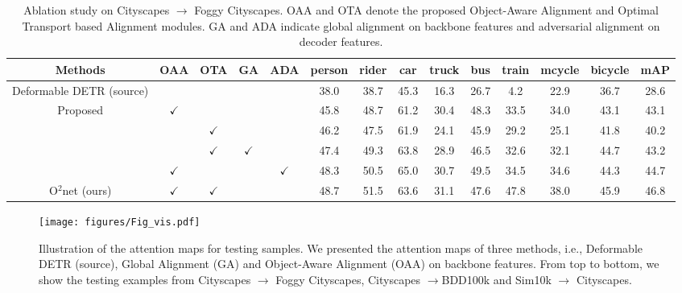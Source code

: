 \documentclass[sigconf]{acmart}
\begin{document}
\begin{table*}[t]
    \centering
    \small
    \caption{Ablation study on Cityscapes $\rightarrow$ Foggy Cityscapes. OAA and OTA denote the proposed Object-Aware Alignment and Optimal Transport based Alignment modules. GA and ADA indicate global alignment on backbone features and adversarial alignment on decoder features.} \label{tab:ablation}
    \setlength{\tabcolsep}{2mm}
    \begin{tabular}{c|cccc|cccccccc|c}
        \toprule[1.0pt]
        Methods & OAA & OTA & GA & ADA  & person & rider & car & truck & bus & train & mcycle & bicycle & mAP \\
        \hline
        Deformable DETR (source) &  &  &  &  & 38.0 & 38.7 & 45.3 & 16.3 & 26.7 & 4.2 & 22.9 & 36.7  & 28.6 \\
        \hline
\multirow{4}{*}{Proposed} & $\checkmark$ &  &  &  & 45.8 & 48.7 & 61.2 & 30.4 & 48.3 & 33.5 & 34.0 & 43.1 & 43.1 \\
&  & $\checkmark$ &  &  & 46.2 & 47.5 & 61.9 & 24.1 & 45.9 & 29.2 & 25.1 & 41.8 & 40.2 \\
         &  & $\checkmark$ & $\checkmark$ &  & 47.4 & 49.3 & 63.8 & 28.9 & 46.5 & 32.6 & 32.1 & 44.7 & 43.2 \\
         & $\checkmark$ &  &  & $\checkmark$ & 48.3 & 50.5 & 65.0 & 30.7 & 49.5 & 34.5 & 34.6 & 44.3 & 44.7 \\
        \hline
        
        O$^2$net (ours) & $\checkmark$ & $\checkmark$ &  &  & 48.7 & 51.5 & 63.6 & 31.1 & 47.6 & 47.8 & 38.0 & 45.9 & 46.8 \\
        \bottomrule[1.0pt]
    \end{tabular}
\vspace{-4mm}
\end{table*}

\begin{figure*}[t]
    \centerline{\texttt{[image: figures/Fig\_vis.pdf]}} \vspace{-4mm}
    \caption{Illustration of the attention maps for testing samples. We presented the attention maps of three methods, i.e., Deformable DETR (source), Global Alignment (GA) and Object-Aware Alignment (OAA) on backbone features. From top to bottom, we show the testing examples from Cityscapes $\rightarrow$ Foggy Cityscapes, Cityscapes $\rightarrow$BDD100k and Sim10k $\rightarrow$ Cityscapes.}
    \label{fig:fig_heatmap}
    \vspace{-4mm}
\end{figure*}
\end{document}
